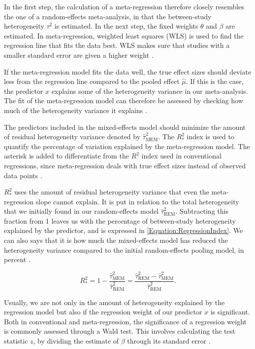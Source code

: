 \documentclass[../../../main.tex]{subfiles}
\begin{document}
In the first step, the calculation of a meta-regression therefore closely resembles the one of a random-effects meta-analysis, in that the between-study heterogeneity $\tau^2$ is estimated. In the next step, the fixed weights $\theta$ and $\beta$ are estimated. In meta-regression, weighted least squares (WLS) is used to find the regression line that fits the data best. WLS makes sure that studies with a smaller standard error are given a higher weight \autocite{Harrer2021}.

If the meta-regression model fits the data well, the true effect sizes should deviate less from the regression line compared to the pooled effect $\hat{\mu}$. If this is the case, the predictor $x$ explains some of the heterogeneity variance in our meta-analysis. The fit of the meta-regression model can therefore be assessed by checking how much of the heterogeneity variance it explains \autocite{Harrer2021}.

The predictors included in the mixed-effects model should minimize the amount of residual heterogeneity variance denoted by $\hat{\tau}_\text{MEM}^2$. The $R_\ast^2$ index is used to quantify the percentage of variation explained by the meta-regression model. The asterisk is added to differentiate from the $R^2$ index used in conventional regressions, since meta-regression deals with true effect sizes instead of observed data points \autocite{Harrer2021}.

$R_\ast^2$ uses the amount of residual heterogeneity variance that even the meta-regression slope cannot explain. It is put in relation to the total heterogeneity that we initially found in our random-effects model $\hat{\tau}_\text{REM}^2$. Subtracting this fraction from 1 leaves us with the percentage of between-study heterogeneity explained by the predictor, and is expressed in \autoref{Equation:RegressionIndex}. We can also says that it is how much the mixed-effects model has reduced the heterogeneity variance compared to the initial random-effects pooling model, in percent \autocite{Harrer2021}.

\begin{equation}
R_\ast^2
= 1 - \frac{\hat{\tau}_\text{MEM}^2}{\hat{\tau}_\text{REM}^2}
= \frac{\hat{\tau}_\text{REM}^2-\hat{\tau}_\text{MEM}^2}{\hat{\tau}_\text{REM}^2}.
\label{Equation:RegressionIndex}
\end{equation}

Usually, we are not only in the amount of heterogeneity explained by the regression model but also if the regression weight of our predictor $x$ is significant. Both in conventional and meta-regression, the significance of a regression weight is commonly assessed through a Wald test. This involves calculating the test statistic $z$, by dividing the estimate of $\beta$ through its standard error \autocite{Harrer2021}.
\end{document}
